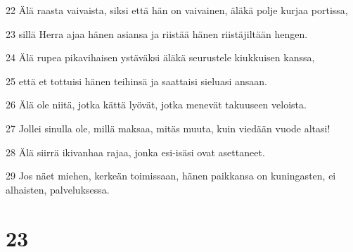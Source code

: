 \par 22 Älä raasta vaivaista, siksi että hän on vaivainen, äläkä polje kurjaa portissa,
\par 23 sillä Herra ajaa hänen asiansa ja riistää hänen riistäjiltään hengen.
\par 24 Älä rupea pikavihaisen ystäväksi äläkä seurustele kiukkuisen kanssa,
\par 25 että et tottuisi hänen teihinsä ja saattaisi sieluasi ansaan.
\par 26 Älä ole niitä, jotka kättä lyövät, jotka menevät takuuseen veloista.
\par 27 Jollei sinulla ole, millä maksaa, mitäs muuta, kuin viedään vuode altasi!
\par 28 Älä siirrä ikivanhaa rajaa, jonka esi-isäsi ovat asettaneet.
\par 29 Jos näet miehen, kerkeän toimissaan, hänen paikkansa on kuningasten, ei alhaisten, palveluksessa.

\chapter{23}

